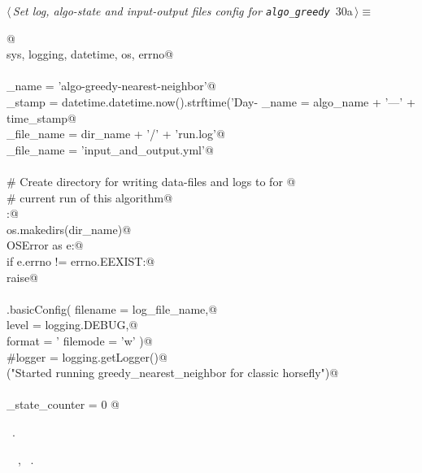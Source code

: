 \documentclass[11.5pt]{report}
\begin{document}
\begin{flushleft} \small\label{scrap37}\raggedright\small
{} $\langle\,${\itshape Set log, algo-state and input-output files config for \verb|algo_greedy|}\nobreak\ {\footnotesize {30a}}$\,\rangle\equiv$
\vspace{-1ex}
\begin{list}{}{} \item
\mbox{}\verb@  @\\
\mbox{}\verb@import sys, logging, datetime, os, errno@\\
\mbox{}\verb@@\\
\mbox{}\verb@algo_name     = 'algo-greedy-nearest-neighbor'@\\
\mbox{}\verb@time_stamp    = datetime.datetime.now().strftime('Day-%Y-%m-%d_ClockTime-%H:%M:%S')@\\
\mbox{}\verb@dir_name      = algo_name + '---' + time_stamp@\\
\mbox{}\verb@log_file_name = dir_name + '/' + 'run.log'@\\
\mbox{}\verb@io_file_name  = 'input_and_output.yml'@\\
\mbox{}\verb@@\\
\mbox{}\verb@# Create directory for writing data-files and logs to for @\\
\mbox{}\verb@# current run of this algorithm@\\
\mbox{}\verb@try:@\\
\mbox{}\verb@    os.makedirs(dir_name)@\\
\mbox{}\verb@except OSError as e:@\\
\mbox{}\verb@    if e.errno != errno.EEXIST:@\\
\mbox{}\verb@        raise@\\
\mbox{}\verb@@\\
\mbox{}\verb@logging.basicConfig( filename = log_file_name,@\\
\mbox{}\verb@                     level    = logging.DEBUG,@\\
\mbox{}\verb@                     format   = '%(asctime)s: %(levelname)s: %(message)s',@\\
\mbox{}\verb@                     filemode = 'w' )@\\
\mbox{}\verb@#logger = logging.getLogger()@\\
\mbox{}\verb@info("Started running greedy_nearest_neighbor for classic horsefly")@\\
\mbox{}\verb@@\\
\mbox{}\verb@algo_state_counter = 0 @\\
\mbox{}\verb@@{\NWsep}
\end{list}
\vspace{-1.5ex}
\footnotesize
\begin{list}{}{\setlength{\itemsep}{-\parsep}\setlength{\itemindent}{-\leftmargin}}
\item \NWtxtMacroRefIn\ .
\item \NWtxtIdentsUsed\nobreak\  \verb@greedy@\nobreak\ , \verb@logger@\nobreak\ .
\item{}
\end{list}
\vspace{4ex}
\end{flushleft}
\end{document}
